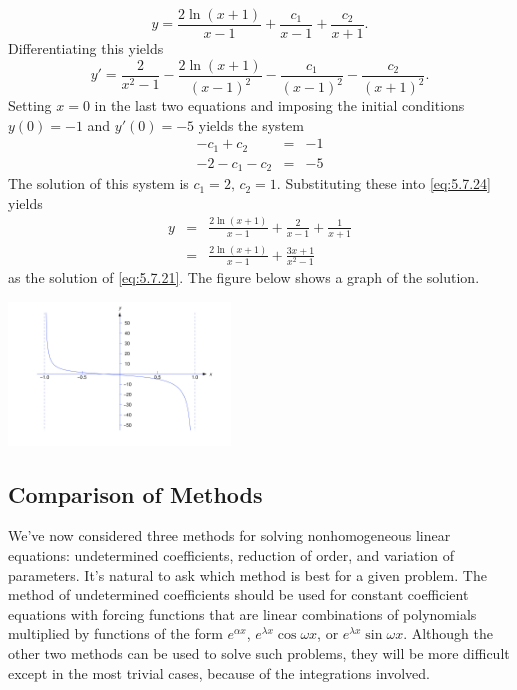 \documentclass{ximera}
\begin{document}
\begin{example}
\begin{explanation}
\begin{equation}
y=\frac{2\ln(x+1)}{x-1}+\frac{c_1}{x-1}+\frac{c_2}{x+1}.
\end{equation}
Differentiating this yields
$$
y'=\frac{2}{x^2-1}-\frac{2\ln(x+1)}{(x-1)^2}-\frac{c_1}{(x-1)^2}-\frac{c_2}{(x+1)^2}.
$$
Setting $x=0$ in the last two equations and imposing the initial conditions
$y(0)=-1$ and $y'(0)=-5$ yields the system
\begin{eqnarray*}
-c_1+c_2&=&-1\\
-2-c_1-c_2&=&-5
\end{eqnarray*}
The solution of this system is $c_1=2,\,c_2=1$.  Substituting
these into
\eqref{eq:5.7.24} yields
\begin{eqnarray*}
y&=&\frac{2\ln(x+1)}{x-1}+\frac{2}{x-1}+\frac{1}{x+1}\\
&=&\frac{2\ln(x+1)}{x-1}+\frac{3x+1}{x^2-1}
\end{eqnarray*}
as the solution of  \eqref{eq:5.7.21}. The figure below shows a graph of the solution.
 
 
\begin{image}
  \includegraphics[height=1.5in]{fig050701.jpg}
\end{image}
\end{explanation}
\end{example}
 
\subsection{Comparison of Methods}
 
We've now considered three methods
for solving  nonhomogeneous linear equations: undetermined
coefficients, reduction of order, and variation of parameters. It's
natural to ask which method is best for a given problem. The method of
undetermined coefficients should be used for constant coefficient
equations with forcing functions that are linear combinations of
polynomials multiplied by functions of the form $e^{\alpha x}$,
$e^{\lambda x}\cos \omega x$, or $e^{\lambda x}\sin \omega x$.
Although the other two methods can be used to solve such problems,
they will be more difficult except in the most trivial cases, because
of the integrations involved.
 
\end{document}
